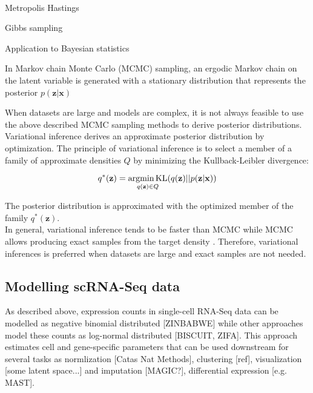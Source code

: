 \\

Metropolis Hastings \citep{Metropolis1953, Hastings1970}

Gibbs sampling \citep{Geman1984}

Application to Bayesian statistics \citep{Gelfand1990}

In Markov chain Monte Carlo (MCMC) sampling, an ergodic Markov chain on the latent variable is generated with a stationary distribution that represents the posterior $p(\mathbf{z}|\mathbf{x})$  


When datasets are large and models are complex, it is not always feasible to use the above described MCMC sampling methods to derive posterior distributions. Variational inference derives an approximate posterior distribution by optimization. The principle of variational inference is to select a member of a family of approximate densities $Q$ by minimizing the Kullback-Leibler divergence:

\begin{equation}
q^\ast(\mathbf{z})=\underset{q(\mathbf{z})\in{}Q}{\textnormal{argmin\,{}KL}}(q(\mathbf{z})||p(\mathbf{z}|\mathbf{x}))
\end{equation}

The posterior distribution is approximated with the optimized member of the family $q^\ast(\mathbf{z})$\citep{Blei2017}.\\
In general, variational inference tends to be faster than MCMC while MCMC allows producing exact samples from the target density \citep{Blei2017}. Therefore, variational inferences is preferred when datasets are large and exact samples are not needed.


\subsection{Modelling scRNA-Seq data}

As described above, expression counts in single-cell RNA-Seq data can be modelled as negative binomial distributed [ZINBABWE] while other approaches model these counts as log-normal distributed [BISCUIT, ZIFA]. This approach estimates cell and gene-specific parameters that can be used downstream for several tasks as normlization [Catas Nat Methods], clustering [ref], visualization [some latent space...] and imputation [MAGIC?], differential expression [e.g. MAST].  

